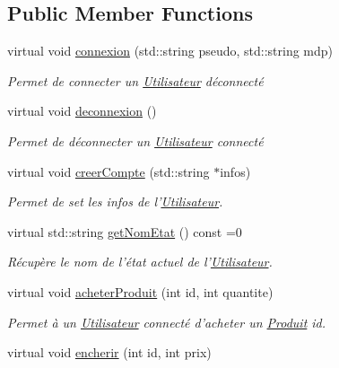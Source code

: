 \subsection*{Public Member Functions}
\begin{DoxyCompactItemize}
\item 
virtual void \hyperlink{classStateUtilisateur_acf5e22c491f018f44114b4de2e22cba2}{connexion} (std\-::string pseudo, std\-::string mdp)
\begin{DoxyCompactList}\small\item\em Permet de connecter un \hyperlink{classUtilisateur}{Utilisateur} déconnecté \end{DoxyCompactList}\item 
\hypertarget{classStateUtilisateur_a7219631d1a792b86e6cb1baaed036cdd}{virtual void \hyperlink{classStateUtilisateur_a7219631d1a792b86e6cb1baaed036cdd}{deconnexion} ()}\label{classStateUtilisateur_a7219631d1a792b86e6cb1baaed036cdd}

\begin{DoxyCompactList}\small\item\em Permet de déconnecter un \hyperlink{classUtilisateur}{Utilisateur} connecté \end{DoxyCompactList}\item 
virtual void \hyperlink{classStateUtilisateur_a46a74017e52db98001f089e67f4dd7d1}{creer\-Compte} (std\-::string $\ast$infos)
\begin{DoxyCompactList}\small\item\em Permet de set les infos de l'\hyperlink{classUtilisateur}{Utilisateur}. \end{DoxyCompactList}\item 
virtual std\-::string \hyperlink{classStateUtilisateur_aa0905985b352d22fd18ecbfae5d319a8}{get\-Nom\-Etat} () const =0
\begin{DoxyCompactList}\small\item\em Récupère le nom de l'état actuel de l'\hyperlink{classUtilisateur}{Utilisateur}. \end{DoxyCompactList}\item 
\hypertarget{classStateUtilisateur_a6312084252e725b07f3061aed8530eae}{virtual void \hyperlink{classStateUtilisateur_a6312084252e725b07f3061aed8530eae}{acheter\-Produit} (int id, int quantite)}\label{classStateUtilisateur_a6312084252e725b07f3061aed8530eae}

\begin{DoxyCompactList}\small\item\em Permet à un \hyperlink{classUtilisateur}{Utilisateur} connecté d'acheter un \hyperlink{classProduit}{Produit} id. \end{DoxyCompactList}\item 
\hypertarget{classStateUtilisateur_a4e20c37e50a369d6f1263776992ada7c}{virtual void \hyperlink{classStateUtilisateur_a4e20c37e50a369d6f1263776992ada7c}{encherir} (int id, int prix)}\label{classStateUtilisateur_a4e20c37e50a369d6f1263776992ada7c}


\end{DoxyCompactItemize}
